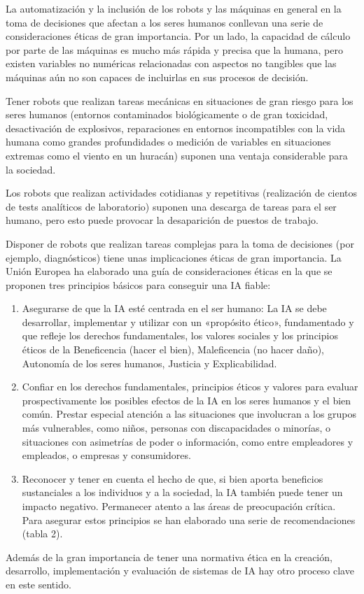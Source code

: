 \documentclass[10pt]{article}
\begin{document}
La automatización y   la   inclusión   de   los   robots y las máquinas en general en la toma de decisiones que afectan a los seres humanos conllevan una serie de consideraciones éticas de   gran   importancia.   Por un lado, la capacidad de cálculo por parte de las máquinas es mucho más rápida y precisa que la humana, pero existen variables no numéricas relacionadas con aspectos no tangibles que las máquinas aún no son capaces de incluirlas en sus procesos de decisión.


Tener robots que realizan tareas mecánicas en situaciones de gran riesgo para los seres humanos (entornos contaminados biológicamente o de gran toxicidad, desactivación de explosivos, reparaciones en entornos incompatibles con la vida humana como grandes profundidades o medición de variables en situaciones extremas como el viento en un huracán) suponen una ventaja considerable para la sociedad.


Los robots que realizan actividades cotidianas y repetitivas (realización de cientos de tests analíticos de laboratorio) suponen una descarga de tareas para el ser humano, pero esto puede provocar la desaparición de puestos de trabajo.


Disponer de robots que realizan tareas complejas para la toma de decisiones (por ejemplo, diagnósticos) tiene unas implicaciones éticas de gran importancia. La Unión Europea ha elaborado una guía de consideraciones éticas en la que se proponen tres principios básicos para conseguir una IA ﬁable:
        \begin{enumerate}
            \item Asegurarse de que la IA esté centrada en el ser humano: La IA se debe desarrollar, implementar y utilizar con un «propósito ético», fundamentado y que refleje los derechos fundamentales, los valores sociales y los principios éticos de la Beneficencia (hacer el bien), Maleficencia (no hacer daño), Autonomía de los seres humanos, Justicia y Explicabilidad.
            \item Confiar en los derechos fundamentales, principios éticos y valores para evaluar prospectivamente los posibles efectos de la IA en los seres humanos y el bien común. Prestar especial atención a las situaciones que involucran a los grupos más vulnerables, como niños, personas con discapacidades o minorías, o situaciones con asimetrías de poder o información, como entre empleadores y empleados, o empresas y consumidores.
            \item Reconocer y tener en cuenta el hecho de que, si bien aporta beneficios sustanciales a los individuos y a la sociedad, la IA también puede tener un impacto negativo. Permanecer atento a las áreas de preocupación crítica. Para asegurar estos principios se han elaborado una serie de recomendaciones (tabla 2).
        \end{enumerate}
Además de la gran importancia de tener una normativa ética en la creación, desarrollo, implementación y evaluación de sistemas de IA hay otro proceso clave en este sentido.
\end{document}
